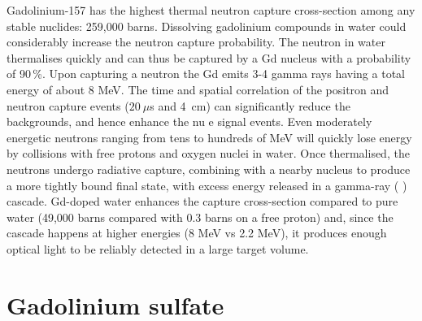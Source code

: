 Gadolinium-157 has the highest thermal neutron capture cross-section among any stable %
nuclides: 259,000 barns.
Dissolving gadolinium compounds in water could considerably increase the neutron capture probability.
The neutron in water thermalises quickly and can thus be captured by a Gd nucleus with a probability of 90\,\%.
Upon capturing a neutron the Gd emits 3-4 gamma rays having a total energy of about 8 MeV.
The time and spatial correlation of the positron and neutron capture events ($20~\mu$s and 4~cm) %
can significantly reduce the backgrounds, and hence enhance the nu e signal events.
Even moderately energetic neutrons ranging from tens to hundreds of MeV will quickly lose energy %
by collisions with free protons and oxygen nuclei in water. 
Once thermalised, the neutrons undergo radiative capture, combining with a nearby nucleus to %
produce a more tightly bound final state, with excess energy released in a gamma-ray ( ) cascade. 
Gd-doped water enhances the capture cross-section compared to pure water %
(49,000 barns compared with 0.3 barns on a free proton) and, since the cascade happens %
at higher energies (8 MeV vs 2.2 MeV), it produces enough optical light to be reliably detected in %
a large target volume.

\section{Gadolinium sulfate}

